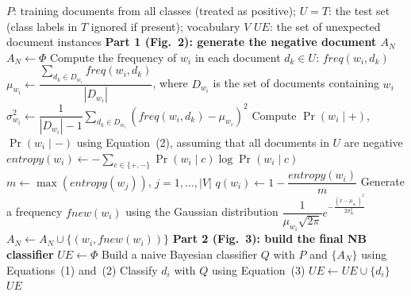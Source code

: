 \documentclass{article}
\begin{document}
\begin{algorithm}[!h]
\renewcommand{\algorithmicrequire}{\textbf{Input:}}
\renewcommand{\algorithmicensure}{\textbf{Output:}}
	\caption{LGN: generating a negative document $A_{N}$ and building the final NB classifier}
	\begin{algorithmic}[1]
	    \REQUIRE
	    $P$: training documents from all classes (treated as positive);
	    $U=T$: the test set (class labels in $T$ ignored if present);
	    vocabulary $V$
	    \ENSURE
	    $UE$: the set of unexpected document instances
	    \STATE \textbf{Part 1 (Fig.~2): generate the negative document $A_{N}$}
	    \STATE $A_{N}\leftarrow \Phi$
	    \STATE Compute the frequency of $w_{i}$ in each document $d_{k}\in U$: $freq(w_{i},d_{k})$
	    \STATE $\mu_{w_{i}}\leftarrow \dfrac{\sum_{d_{k}\in D_{w_{i}}}freq(w_{i},d_{k})}{|D_{w_{i}}|}$,
	    where $D_{w_{i}}$ is the set of documents containing $w_{i}$
	    \STATE $\sigma_{w_{i}}^{2}\leftarrow \dfrac{1}{|D_{w_{i}}|-1}\sum_{d_{k}\in D_{w_{i}}}
	    \left(freq(w_{i},d_{k})-\mu_{w_{i}}\right)^{2}$
	    \ENDFOR
	    \STATE Compute $\Pr(w_{i}\mid +)$, $\Pr(w_{i}\mid -)$ using Equation~(2), assuming that all
	    documents in $U$ are negative %
	    \STATE $entropy(w_{i})\leftarrow -\sum_{c\in\{+,-\}}\Pr(w_{i}\mid c)\log\Pr(w_{i}\mid c)$
	    \ENDFOR
	    \STATE $m\leftarrow \max\left(entropy(w_{j})\right)$, $j=1,\dots,|V|$
	    \STATE $q(w_{i})\leftarrow 1-\dfrac{entropy(w_{i})}{m}$ %
	    \STATE Generate a frequency $fnew(w_{i})$ using the Gaussian distribution
	    $\dfrac{1}{\mu_{w_{i}}\sqrt{2\pi}}e^{-\frac{(x-\mu_{w_{i}})^{2}}{2\sigma_{w_{i}}^{2}}}$
	    \STATE $A_{N}\leftarrow A_{N}\cup\{(w_{i},fnew(w_{i}))\}$
	    \ENDFOR
	    \ENDFOR
	    \STATE \textbf{Part 2 (Fig.~3): build the final NB classifier}
	    \STATE $UE\leftarrow \Phi$
	    \STATE Build a naive Bayesian classifier $Q$ with $P$ and $\{A_{N}\}$ using Equations~(1) and~(2) %
	    \STATE Classify $d_{i}$ with $Q$ using Equation~(3)
	    \STATE $UE\leftarrow UE\cup\{d_{i}\}$
	    \ENDIF
	    \ENDFOR
		\RETURN $UE$
	\end{algorithmic}
\end{algorithm}
\end{document}
